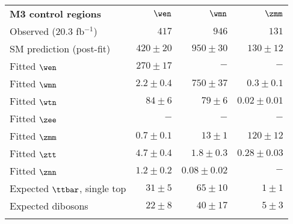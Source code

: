 \begin{table}[!ht]
\begin{center}
\setlength{\tabcolsep}{0.0pc}
{\footnotesize
    \begin{tabular*}{\textwidth}{@{\extracolsep{\fill}}lrrr}
  \noalign{\smallskip}\hline\noalign{\smallskip}
  {\bf  M3 control regions}           & $\wen$            & $\wmn$            & $\zmm$              \\[-0.05cm]
  \noalign{\smallskip}\hline\noalign{\smallskip}
    Observed  (20.3 fb${}^{-1}$)            & $417$              & $946$              & $131$                    \\
    \noalign{\smallskip}\hline\noalign{\smallskip}
    SM prediction (post-fit)          & $420 \pm 20$          & $950 \pm 30$          & $130 \pm 12$              \\
    \noalign{\smallskip}\hline\noalign{\smallskip}
    Fitted $\wen$          & $270 \pm 17$          & $-$          & $-$              \\
    Fitted $\wmn$          & $2.2 \pm 0.4$          & $750 \pm 37$          & $0.3 \pm 0.1$              \\
    Fitted $\wtn$          & $84 \pm 6$          & $79 \pm 6$          & $0.02 \pm 0.01$              \\
    Fitted $\zee$          & $-$          & $-$          & $-$              \\
    Fitted $\zmm$          & $0.7 \pm 0.1$          & $13 \pm 1$          & $120 \pm 12$              \\
    Fitted $\ztt$          & $4.7 \pm 0.4$          & $1.8 \pm 0.3$          & $0.28 \pm 0.03$              \\
    Fitted $\znn$          & $1.2 \pm 0.2$          & $0.08 \pm 0.02$          & $-$              \\
    Expected $\ttbar$, single top        & $31 \pm 5$          & $65 \pm 10$          & $1 \pm 1$              \\
    Expected dibosons          & $22 \pm 8$          & $40 \pm 17$          & $5 \pm 3$              \\
    \noalign{\smallskip}\hline\noalign{\smallskip}

\end{tabular*}}
\end{center}
\end{table}
